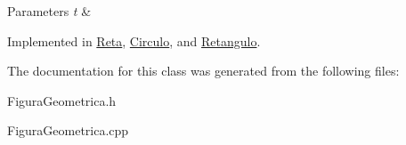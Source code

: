 \begin{DoxyParams}{Parameters}
{\em t} & \\
\hline
\end{DoxyParams}


Implemented in \hyperlink{classReta_ac2e9805183cd474b62bffd8b032cd780}{Reta}, \hyperlink{classCirculo_a593787d6e0618c2eded23e8839e7bea6}{Circulo}, and \hyperlink{classRetangulo_ac088dd6d3f4f3d3f80363a868c2e74f1}{Retangulo}.



The documentation for this class was generated from the following files\+:\begin{DoxyCompactItemize}
\item 
Figura\+Geometrica.\+h\item 
Figura\+Geometrica.\+cpp\end{DoxyCompactItemize}

